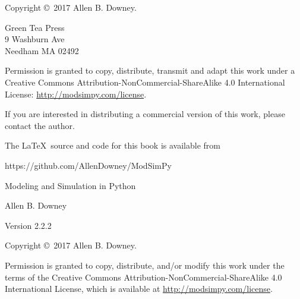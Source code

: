 \documentclass[12pt]{book}
\newcommand{\thetitle}{Modeling and Simulation in Python}
\newcommand{\theauthors}{Allen B. Downey}
\newcommand{\theversion}{2.2.2}
\theoremstyle{exercise}
\begin{document}
\begin{latexonly}
\begin{flushright}
\vfill

\end{flushright}



\pagebreak
\thispagestyle{empty}

Copyright \copyright ~2017 \theauthors.



\vspace{0.2in}

\begin{flushleft}
Green Tea Press       \\
9 Washburn Ave \\
Needham MA 02492
\end{flushleft}

Permission is granted to copy, distribute, transmit and adapt this work under a Creative Commons Attribution-NonCommercial-ShareAlike 4.0 International License: \url{http://modsimpy.com/license}.

If you are interested in distributing a commercial version of this
work, please contact the author.

The \LaTeX\ source and code for this book is available from

\begin{code}
https://github.com/AllenDowney/ModSimPy
\end{code}


\cleardoublepage
\setcounter{tocdepth}{1}
\tableofcontents

\end{latexonly}



\begin{htmlonly}

\vspace{1em}

{\Large \thetitle}

{\large \theauthors}

Version \theversion

\vspace{1em}

Copyright \copyright ~2017 \theauthors.

Permission is granted to copy, distribute, and/or modify this work
under the terms of the Creative Commons
Attribution-NonCommercial-ShareAlike 4.0 International License, which is
available at \url{http://modsimpy.com/license}.

\vspace{1em}

\setcounter{chapter}{-1}

\end{htmlonly}
\end{document}
